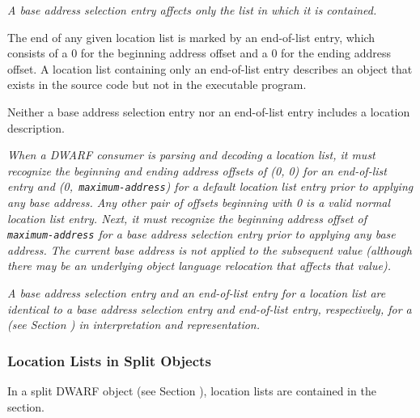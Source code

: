 \textit{A base address selection entry 
affects only the list in which it is contained.}

The end of any given location list is marked by an 
end-of-list entry, which consists of a 0 for the beginning address
offset and a 0 for the ending address offset. A location list
containing only an 
end-of-list entry describes an object that
exists in the source code but not in the executable program.

Neither a base address selection entry nor an end-of-list
entry includes a location description.

\textit{When a DWARF consumer is parsing and decoding a location
list, it must recognize the beginning and ending address
offsets of (0, 0) for an end-of-list entry and 
\mbox{(0, \texttt{maximum-address})} for
a default location list entry prior to applying any base
address. Any other pair of offsets beginning with 0 is a
valid normal location list entry. Next, it must recognize the
beginning address offset of \texttt{maximum-address} for a base address selection
entry prior to applying any base address. The current base
address is not applied to the subsequent value (although there
may be an underlying object language relocation that affects
that value).}

\textit{A base address selection entry and an end-of-list
entry for a location list are identical to a base address
selection entry and end-of-list entry, respectively, for a
(see Section ) 
in interpretation and representation.}

\subsubsection{Location Lists in Split Objects}
\label{chap:locationlistsinsplitobjects}
In a split DWARF object (see 
Section ), 
location lists are contained in the \dotdebuglocdwo{} section.

